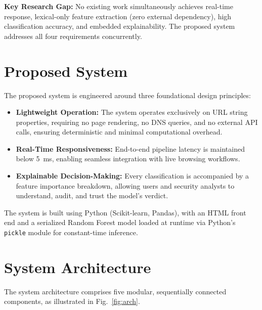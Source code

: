 \documentclass[conference]{IEEEtran}
\begin{document}
\vspace{2pt}
\noindent\textbf{Key Research Gap:} No existing work simultaneously 
achieves real-time response, lexical-only feature extraction (zero 
external dependency), high classification accuracy, and embedded 
explainability. The proposed system addresses all four requirements 
concurrently.

\section{Proposed System}
\label{sec:proposed}

The proposed system is engineered around three foundational design 
principles:

\begin{itemize}[leftmargin=*]
    \item \textbf{Lightweight Operation:} The system operates exclusively 
    on URL string properties, requiring no page rendering, no DNS 
    queries, and no external API calls, ensuring deterministic and 
    minimal computational overhead.
    
    \item \textbf{Real-Time Responsiveness:} End-to-end pipeline 
    latency is maintained below 5~ms, enabling seamless integration 
    with live browsing workflows.
    
    \item \textbf{Explainable Decision-Making:} Every classification 
    is accompanied by a feature importance breakdown, allowing 
    users and security analysts to understand, audit, and trust 
    the model's verdict.
\end{itemize}

The system is built using Python (Scikit-learn, Pandas), with an 
HTML front end and a serialized Random Forest model loaded at runtime 
via Python's \texttt{pickle} module for constant-time inference.

\section{System Architecture}
\label{sec:arch}

The system architecture comprises five modular, sequentially connected 
components, as illustrated in Fig.~\ref{fig:arch}.
\end{document}
